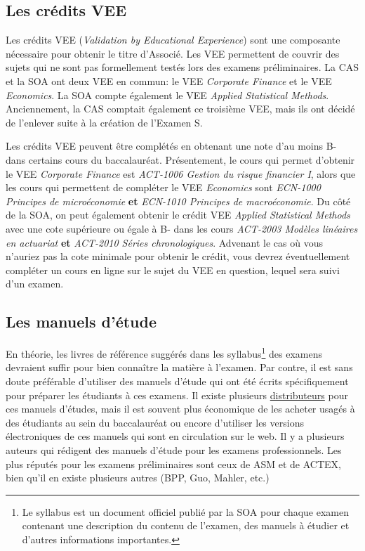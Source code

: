 \documentclass[11pt,french]{article}
\begin{document}
\subsection*{Les crédits VEE}
\label{subsec:vee}
Les crédits VEE (\emph{Validation by Educational Experience}) sont une composante nécessaire pour obtenir le titre d'Associé. Les VEE permettent de couvrir des sujets qui ne sont pas formellement testés lors des examens préliminaires. La CAS et la SOA ont deux VEE en commun: le VEE \emph{Corporate Finance} et le VEE \emph{Economics}. La SOA compte également le VEE \emph{Applied Statistical Methods}. Anciennement, la CAS comptait également ce troisième VEE, mais ils ont décidé de l'enlever suite à la création de l'Examen S.\vspace{\baselineskip}

Les crédits VEE peuvent être complétés en obtenant une note d'au moins B- dans certains cours du baccalauréat. Présentement, le cours qui permet d'obtenir le VEE \emph{Corporate Finance} est \textit{ACT-1006 Gestion du risque financier I}, alors que les cours qui permettent de compléter le VEE \emph{Economics} sont \textit{ECN-1000 Principes de microéconomie} \textbf{et} \textit{ECN-1010 Principes de macroéconomie}. Du côté de la SOA, on peut également obtenir le crédit VEE \emph{Applied Statistical Methods} avec une cote supérieure ou égale à B- dans les cours \textit{ACT-2003 Modèles linéaires en actuariat} \textbf{et} \textit{ACT-2010 Séries chronologiques}. Advenant le cas où vous n'auriez pas la cote minimale pour obtenir le crédit, vous devrez éventuellement compléter un cours en ligne sur le sujet du VEE en question, lequel sera suivi d'un examen.

\newpage
\subsection*{Les manuels d'étude}
\label{subsec:manuels}
En théorie, les livres de référence suggérés dans les syllabus\footnote{Le syllabus est un document officiel publié par la SOA pour chaque examen contenant une description du contenu de l'examen, des manuels à étudier et d'autres informations importantes.}{\tiny} des examens devraient suffir pour bien connaître la matière à l'examen. Par contre, il est sans doute préférable d'utiliser des manuels d'étude qui ont été écrits spécifiquement pour préparer les étudiants à ces examens. Il existe plusieurs \href{https://soa.org/education/exam-req/resources/edu-txt-manuals.aspx}{distributeurs} pour ces manuels d'études, mais il est souvent plus économique de les acheter usagés à des étudiants au sein du baccalauréat ou encore d'utiliser les versions électroniques de ces manuels qui sont en circulation sur le web. Il y a plusieurs auteurs qui rédigent des manuels d'étude pour les examens professionnels. Les plus réputés pour les examens préliminaires sont ceux de ASM et de ACTEX, bien qu'il en existe plusieurs autres (BPP, Guo, Mahler, etc.)\vspace{\baselineskip}
\end{document}
